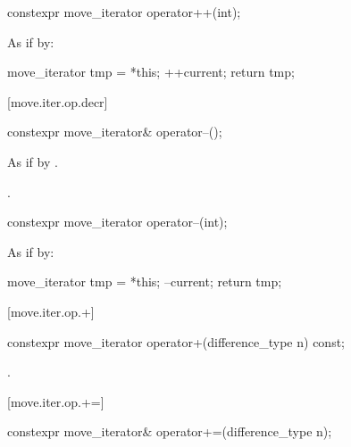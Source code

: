 %
\begin{itemdecl}
constexpr move_iterator operator++(int);
\end{itemdecl}

\begin{itemdescr}
\pnum
\effects
As if by:
\begin{codeblock}
move_iterator tmp = *this;
++current;
return tmp;
\end{codeblock}
\end{itemdescr}

[move.iter.op.decr]{}

%
\begin{itemdecl}
constexpr move_iterator& operator--();
\end{itemdecl}

\begin{itemdescr}
\pnum
\effects As if by .

\pnum
\returns {}.
\end{itemdescr}

%
\begin{itemdecl}
constexpr move_iterator operator--(int);
\end{itemdecl}

\begin{itemdescr}
\pnum
\effects
As if by:
\begin{codeblock}
move_iterator tmp = *this;
--current;
return tmp;
\end{codeblock}
\end{itemdescr}

[move.iter.op.+]{}

%
\begin{itemdecl}
constexpr move_iterator operator+(difference_type n) const;
\end{itemdecl}

\begin{itemdescr}
\pnum
\returns {}.
\end{itemdescr}

[move.iter.op.+=]{}

%
\begin{itemdecl}
constexpr move_iterator& operator+=(difference_type n);
\end{itemdecl}

